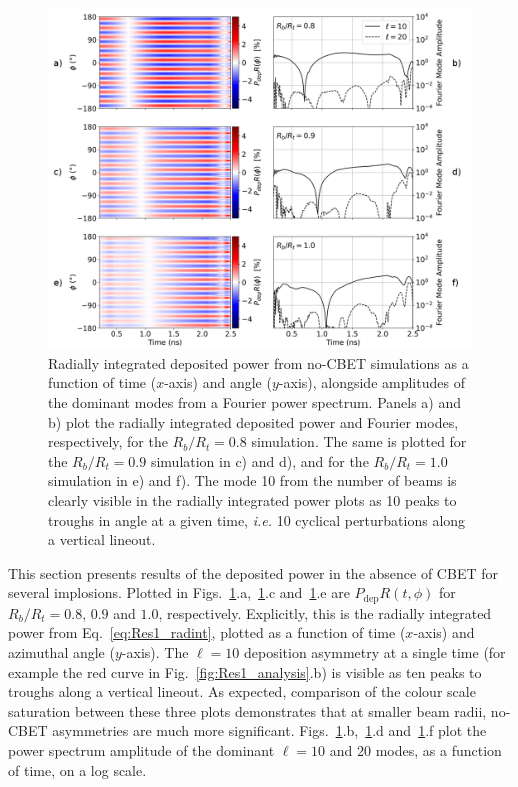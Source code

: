 \begin{figure}[t!]
    \includegraphics[width=\linewidth]{Results1/Images/noCBET_PR_modes.png}
    \centering
    \caption{Radially integrated deposited power from no-\ac{CBET} simulations as a function of time ($x$-axis) and angle ($y$-axis), alongside amplitudes of the dominant modes from a Fourier power spectrum.
    Panels a) and b) plot the radially integrated deposited power and Fourier modes, respectively, for the $R_b/R_t=0.8$ simulation.
    The same is plotted for the $R_b/R_t=0.9$ simulation in c) and d), and for the $R_b/R_t=1.0$ simulation in e) and f).
    The mode 10 from the number of beams is clearly visible in the radially integrated power plots as 10 peaks to troughs in angle at a given time, \textit{i.e.} 10 cyclical perturbations along a vertical lineout.}%
    \label{fig:Res1_PR_noCBET_modes}
\end{figure}

This section presents results of the deposited power in the absence of \ac{CBET} for several implosions.
Plotted in Figs.~\ref{fig:Res1_PR_noCBET_modes}.a,~\ref{fig:Res1_PR_noCBET_modes}.c and~\ref{fig:Res1_PR_noCBET_modes}.e are $P_{\text{dep}}R(t,\phi)$ for $R_b/R_t=0.8$, $0.9$ and $1.0$, respectively.
Explicitly, this is the radially integrated power from Eq.~\ref{eq:Res1_radint}, plotted as a function of time ($x$-axis) and azimuthal angle ($y$-axis).
The $\ell=10$ deposition asymmetry at a single time (for example the red curve in Fig.~\ref{fig:Res1_analysis}.b) is visible as ten peaks to troughs along a vertical lineout.
As expected, comparison of the colour scale saturation between these three plots demonstrates that at smaller beam radii, no-\ac{CBET} asymmetries are much more significant.
Figs.~\ref{fig:Res1_PR_noCBET_modes}.b,~\ref{fig:Res1_PR_noCBET_modes}.d and~\ref{fig:Res1_PR_noCBET_modes}.f plot the power spectrum amplitude of the dominant $\ell=10$ and $20$ modes, as a function of time, on a log scale.

